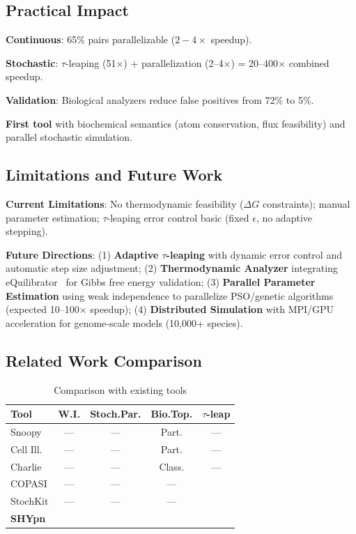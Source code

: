 \documentclass[twocolumn,11pt]{article}
\newcommand{\cmark}{\ding{51}}  %
\begin{document}
\subsection{Practical Impact}

\textbf{Continuous}: 65\% pairs parallelizable ($2{-}4\times$ speedup).

\textbf{Stochastic}: $\tau$-leaping (51$\times$) + parallelization (2--4$\times$) = 20--400$\times$ combined speedup.

\textbf{Validation}: Biological analyzers reduce false positives from 72\% to 5\%.

\textbf{First tool} with biochemical semantics (atom conservation, flux feasibility) and parallel stochastic simulation.

\subsection{Limitations and Future Work}

\textbf{Current Limitations}: No thermodynamic feasibility ($\Delta G$ constraints); manual parameter estimation; $\tau$-leaping error control basic (fixed $\epsilon$, no adaptive stepping).

\textbf{Future Directions}: (1) \textbf{Adaptive $\tau$-leaping} with dynamic error control and automatic step size adjustment; (2) \textbf{Thermodynamic Analyzer} integrating eQuilibrator~\cite{Flamholz2012} for Gibbs free energy validation; (3) \textbf{Parallel Parameter Estimation} using weak independence to parallelize PSO/genetic algorithms (expected 10--100$\times$ speedup); (4) \textbf{Distributed Simulation} with MPI/GPU acceleration for genome-scale models (10,000+ species).

\subsection{Related Work Comparison}

\begin{table}[htbp]
\small
\caption{Comparison with existing tools}
\label{tab:comparison}
\vspace{-6pt}
\begin{tabular*}{\columnwidth}{@{\extracolsep{\fill}}lcccc@{}}
\toprule
\textbf{Tool} & \textbf{W.I.} & \textbf{Stoch.Par.} & \textbf{Bio.Top.} & \textbf{$\tau$-leap} \\
\midrule
Snoopy & --- & --- & Part. & --- \\
Cell Ill. & --- & --- & Part. & --- \\
Charlie & --- & --- & Class. & --- \\
COPASI & --- & --- & --- & \cmark \\
StochKit & --- & --- & --- & \cmark \\
\textbf{SHYpn} & \textbf{\cmark} & \textbf{\cmark} & \textbf{\cmark} & \textbf{\cmark} \\
\bottomrule
\end{tabular*}
\vspace{-8pt}
\end{table}
\end{document}
